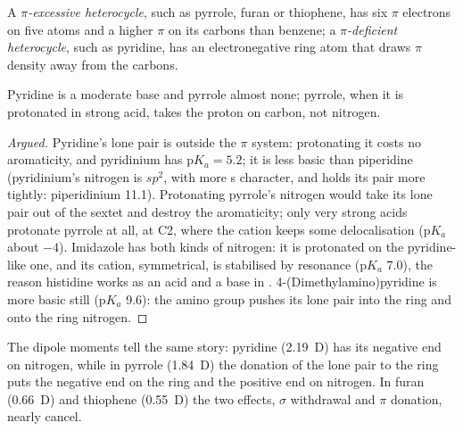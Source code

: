 \begin{definition}\label{def:b3:heterocycles:pi-character}
A \emph{$\pi$-excessive heterocycle}, such as
pyrrole, furan or thiophene, has six $\pi$ electrons on five atoms and a higher
$\pi$  on its carbons than benzene; a \emph{$\pi$-deficient
heterocycle}, such as pyridine, has an
electronegative ring atom that draws $\pi$ density away from the carbons.
\end{definition}

\begin{proposition}[Basicity]\label{prop:b3:heterocycles:basicity}
Pyridine is a moderate base and pyrrole almost none; pyrrole, when it is
protonated in strong acid, takes the proton on carbon, not nitrogen.
\end{proposition}

\begin{proof}[Argued]
Pyridine's lone pair is outside the $\pi$ system: protonating it costs no
aromaticity, and pyridinium has $\mathrm pK_a = 5.2$; it is less basic than piperidine
(pyridinium's nitrogen is $sp^2$, with more s character, and holds its pair more
tightly: piperidinium 11.1). Protonating pyrrole's nitrogen would take its lone
pair out of the sextet and destroy the aromaticity; only very strong acids
protonate pyrrole at all, at C2, where the cation keeps some delocalisation
($\mathrm pK_a$ about $-4$). Imidazole has both kinds of nitrogen: it is protonated on the
pyridine-like one, and its cation, symmetrical, is stabilised by resonance ($\mathrm pK_a$
7.0), the reason histidine works as an acid and a base in .
4-(Dimethylamino)pyridine is more basic still ($\mathrm pK_a$ 9.6): the amino group pushes
its lone pair into the ring and onto the ring nitrogen.
\end{proof}

The dipole moments tell the same story: pyridine (\qty{2.19}{D}) has its negative end
on nitrogen, while in pyrrole (\qty{1.84}{D}) the donation of the lone pair to the ring
puts the negative end on the ring and the positive end on nitrogen. In furan
(\qty{0.66}{D}) and thiophene (\qty{0.55}{D}) the two effects, $\sigma$ withdrawal and $\pi$ donation, nearly
cancel.


